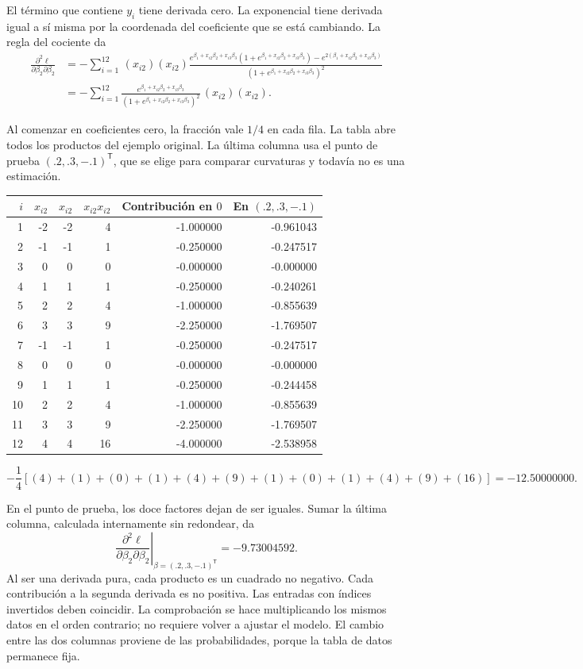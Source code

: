 \documentclass[11pt,a4paper]{article}
\newcommand{\T}{^{\mathsf T}}
\begin{document}
El término que contiene $y_i$ tiene derivada cero.
La exponencial tiene derivada igual a sí misma por la coordenada
del coeficiente que se está cambiando. La regla del cociente da
\[
\begin{aligned}
\frac{\partial^2\ell}{\partial\beta_2\partial\beta_2}&=-\sum_{i=1}^{12}\,(x_{i2})(x_{i2})\frac{e^{\beta_1+x_{i2}\beta_2+x_{i3}\beta_3}(1+e^{\beta_1+x_{i2}\beta_2+x_{i3}\beta_3})-e^{2(\beta_1+x_{i2}\beta_2+x_{i3}\beta_3)}}{(1+e^{\beta_1+x_{i2}\beta_2+x_{i3}\beta_3})^2}\\&=-\sum_{i=1}^{12}\frac{e^{\beta_1+x_{i2}\beta_2+x_{i3}\beta_3}}{(1+e^{\beta_1+x_{i2}\beta_2+x_{i3}\beta_3})^2}\,(x_{i2})(x_{i2}).\end{aligned}
\]

Al comenzar en coeficientes cero, la fracción vale $1/4$ en cada fila.
La tabla abre todos los productos del ejemplo original. La última
columna usa el punto de prueba $(.2,.3,-.1)^\mathsf T$, que se elige
para comparar curvaturas y todavía no es una estimación.
\begin{center}\small
\begin{tabular}{rrrrrr}
\toprule
$i$&$x_{i2}$&$x_{i2}$&$x_{i2}x_{i2}$&Contribución en $0$&En $(.2,.3,-.1)$\\\midrule1&-2&-2&4&-1.000000&-0.961043\\
2&-1&-1&1&-0.250000&-0.247517\\
3&0&0&0&-0.000000&-0.000000\\
4&1&1&1&-0.250000&-0.240261\\
5&2&2&4&-1.000000&-0.855639\\
6&3&3&9&-2.250000&-1.769507\\
7&-1&-1&1&-0.250000&-0.247517\\
8&0&0&0&-0.000000&-0.000000\\
9&1&1&1&-0.250000&-0.244458\\
10&2&2&4&-1.000000&-0.855639\\
11&3&3&9&-2.250000&-1.769507\\
12&4&4&16&-4.000000&-2.538958\\\bottomrule\end{tabular}\end{center}\[
-\frac14\left[(4)+(1)+(0)+(1)+(4)+(9)+(1)+(0)+(1)+(4)+(9)+(16)\right]=-12.50000000.
\]

En el punto de prueba, los doce factores dejan de ser iguales.
Sumar la última columna, calculada internamente sin redondear, da
\[
\left.\frac{\partial^2\ell}{\partial\beta_2\partial\beta_2}\right|_{\beta=(.2,.3,-.1)\T}=-9.73004592.
\]
Al ser una derivada pura, cada producto es un cuadrado no negativo. Cada contribución a la segunda derivada es no positiva.
Las entradas con índices invertidos deben coincidir.
La comprobación se hace multiplicando los mismos datos en el orden
contrario; no requiere volver a ajustar el modelo.
El cambio entre las dos columnas proviene de las probabilidades,
porque la tabla de datos permanece fija.
\end{document}
